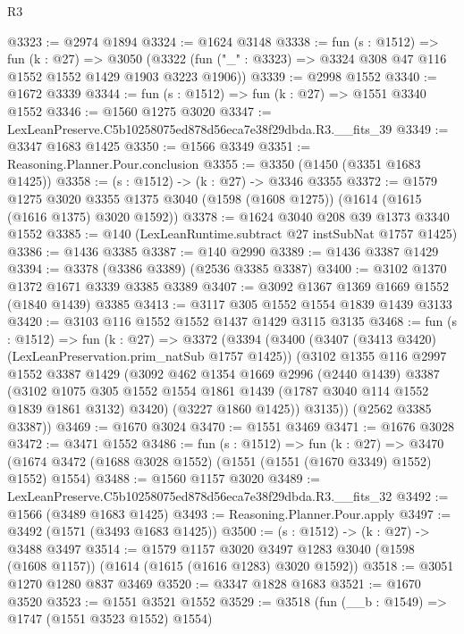 \begin{lexlean}{R3}
\begin{coremodule}
@3323 := @2974 @1894
@3324 := @1624 @3148
@3338 := fun (s : @1512) =>
  fun (k : @27) =>
  @3050 (@3322 (fun ("_" : @3323) => @3324 @308 @47 @116 @1552 @1552 @1429 @1903 @3223 @1906))
@3339 := @2998 @1552
@3340 := @1672 @3339
@3344 := fun (s : @1512) => fun (k : @27) => @1551 @3340 @1552
@3346 := @1560 @1275 @3020
@3347 := LexLeanPreserve.C5b10258075ed878d56eca7e38f29dbda.R3.__fits_39
@3349 := @3347 @1683 @1425
@3350 := @1566 @3349
@3351 := Reasoning.Planner.Pour.conclusion
@3355 := @3350 (@1450 (@3351 @1683 @1425))
@3358 := (s : @1512) -> (k : @27) -> @3346 @3355
@3372 := @1579
    @1275
    @3020
    @3355
    @1375
    @3040
    (@1598 (@1608 @1275))
    (@1614 (@1615 (@1616 @1375) @3020 @1592))
@3378 := @1624 @3040 @208 @39 @1373 @3340 @1552
@3385 := @140 (LexLeanRuntime.subtract @27 instSubNat @1757 @1425)
@3386 := @1436 @3385
@3387 := @140 @2990
@3389 := @1436 @3387 @1429
@3394 := @3378 (@3386 @3389) (@2536 @3385 @3387)
@3400 := @3102 @1370 @1372 @1671 @3339 @3385 @3389
@3407 := @3092 @1367 @1369 @1669 @1552 (@1840 @1439) @3385
@3413 := @3117 @305 @1552 @1554 @1839 @1439 @3133
@3420 := @3103 @116 @1552 @1552 @1437 @1429 @3115 @3135
@3468 := fun (s : @1512) =>
  fun (k : @27) =>
  @3372
    (@3394
      (@3400
        (@3407 (@3413 @3420) (LexLeanPreservation.prim_natSub @1757 @1425))
        (@3102
          @1355
          @116
          @2997
          @1552
          @3387
          @1429
          (@3092
            @462
            @1354
            @1669
            @2996
            (@2440 @1439)
            @3387
            (@3102
              @1075
              @305
              @1552
              @1554
              @1861
              @1439
              (@1787 @3040 @114 @1552 @1839 @1861 @3132)
              @3420)
            (@3227 @1860 @1425))
          @3135))
      (@2562 @3385 @3387))
@3469 := @1670 @3024
@3470 := @1551 @3469
@3471 := @1676 @3028
@3472 := @3471 @1552
@3486 := fun (s : @1512) =>
  fun (k : @27) =>
  @3470 (@1674 @3472 (@1688 @3028 @1552) (@1551 (@1551 (@1670 @3349) @1552) @1552) @1554)
@3488 := @1560 @1157 @3020
@3489 := LexLeanPreserve.C5b10258075ed878d56eca7e38f29dbda.R3.__fits_32
@3492 := @1566 (@3489 @1683 @1425)
@3493 := Reasoning.Planner.Pour.apply
@3497 := @3492 (@1571 (@3493 @1683 @1425))
@3500 := (s : @1512) -> (k : @27) -> @3488 @3497
@3514 := @1579
    @1157
    @3020
    @3497
    @1283
    @3040
    (@1598 (@1608 @1157))
    (@1614 (@1615 (@1616 @1283) @3020 @1592))
@3518 := @3051 @1270 @1280 @837 @3469
@3520 := @3347 @1828 @1683
@3521 := @1670 @3520
@3523 := @1551 @3521 @1552
@3529 := @3518 (fun (__b : @1549) => @1747 (@1551 @3523 @1552) @1554)

\end{coremodule}
\end{lexlean}
